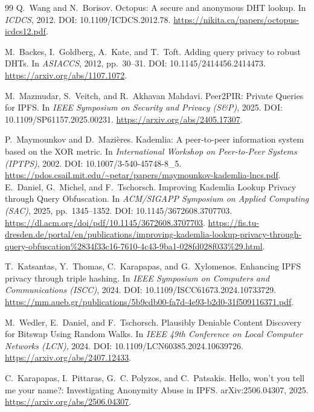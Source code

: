 \documentclass[11pt]{article}
\theoremstyle{definition}
\theoremstyle{remark}
\begin{document}
\begin{thebibliography}{99}
Q.~Wang and N.~Borisov.
\newblock Octopus: A secure and anonymous DHT lookup.
\newblock In \emph{ICDCS}, 2012.
\newblock DOI: 10.1109/ICDCS.2012.78.
\newblock \url{https://nikita.ca/papers/octopus-icdcs12.pdf}.

M.~Backes, I.~Goldberg, A.~Kate, and T.~Toft.
\newblock Adding query privacy to robust DHTs.
\newblock In \emph{ASIACCS}, 2012, pp.~30--31.
\newblock DOI: 10.1145/2414456.2414473. \url{https://arxiv.org/abs/1107.1072}.


M.~Mazmudar, S.~Veitch, and R.~Akhavan Mahdavi.
\newblock Peer2PIR: Private Queries for IPFS.
\newblock In \emph{IEEE Symposium on Security and Privacy (S\&P)}, 2025.
\newblock DOI: 10.1109/SP61157.2025.00231.
\newblock \url{https://arxiv.org/abs/2405.17307}.

P.~Maymounkov and D.~Mazi\`eres.
\newblock Kademlia: A peer-to-peer information system based on the XOR metric.
\newblock In \emph{International Workshop on Peer-to-Peer Systems (IPTPS)}, 2002.
\newblock DOI: 10.1007/3-540-45748-8\_5. \url{https://pdos.csail.mit.edu/~petar/papers/maymounkov-kademlia-lncs.pdf}.
E.~Daniel, G.~Michel, and F.~Tschorsch.
\newblock Improving Kademlia Lookup Privacy through Query Obfuscation.
\newblock In \emph{ACM/SIGAPP Symposium on Applied Computing (SAC)}, 2025, pp.~1345--1352.
\newblock DOI: 10.1145/3672608.3707703.
\newblock \url{https://dl.acm.org/doi/pdf/10.1145/3672608.3707703}.
\newblock \url{https://fis.tu-dresden.de/portal/en/publications/improving-kademlia-lookup-privacy-through-query-obfuscation%2834f33c16-7610-4c43-9ba1-028fd028f033%29.html}.

T.~Katsantas, Y.~Thomas, C.~Karapapas, and G.~Xylomenos.
\newblock Enhancing IPFS privacy through triple hashing.
\newblock In \emph{IEEE Symposium on Computers and Communications (ISCC)}, 2024.
\newblock DOI: 10.1109/ISCC61673.2024.10733729.
\newblock \url{https://mm.aueb.gr/publications/5b9cdb00-fa7d-4e93-b2d0-31f509116371.pdf}.

M.~Wedler, E.~Daniel, and F.~Tschorsch.
\newblock Plausibly Deniable Content Discovery for Bitswap Using Random Walks.
\newblock In \emph{IEEE 49th Conference on Local Computer Networks (LCN)}, 2024.
\newblock DOI: 10.1109/LCN60385.2024.10639726.
\newblock \url{https://arxiv.org/abs/2407.12433}.

C.~Karapapas, I.~Pittaras, G.~C. Polyzos, and C.~Patsakis.
\newblock Hello, won't you tell me your name?: Investigating Anonymity Abuse in IPFS.
\newblock arXiv:2506.04307, 2025.
\newblock \url{https://arxiv.org/abs/2506.04307}.




\end{thebibliography}
\end{document}

